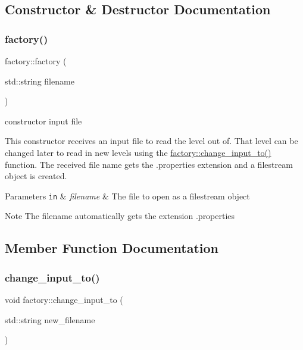 \subsection{Constructor \& Destructor Documentation}
\mbox{\label{classfactory_af422815046ef8b9e95a4d8cb747fc43f}} 
\subsubsection{\texorpdfstring{factory()}{factory()}}
{\footnotesize\ttfamily factory\+::factory (\begin{DoxyParamCaption}\item[{std\+::string}]{filename }\end{DoxyParamCaption})}



constructor input file 

This constructor receives an input file to read the level out of. That level can be changed later to read in new levels using the \hyperlink{classfactory_a9e164a8fbb65188de99c39d55d7cc384}{factory\+::change\+\_\+input\+\_\+to()} function. The received file name gets the .properties extension and a filestream object is created. 
\begin{DoxyParams}[1]{Parameters}
\mbox{\tt in}  & {\em filename} & The file to open as a filestream object \\
\hline
\end{DoxyParams}
\begin{DoxyNote}{Note}
The filename automatically gets the extension .properties 
\end{DoxyNote}


\subsection{Member Function Documentation}
\mbox{\label{classfactory_a9e164a8fbb65188de99c39d55d7cc384}} 
\subsubsection{\texorpdfstring{change\+\_\+input\+\_\+to()}{change\_input\_to()}}
{\footnotesize\ttfamily void factory\+::change\+\_\+input\+\_\+to (\begin{DoxyParamCaption}\item[{std\+::string}]{new\+\_\+filename }\end{DoxyParamCaption})}



